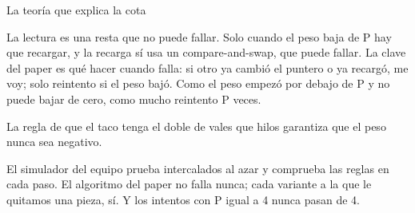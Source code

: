 \begin{frame}{La teoría que explica la cota}
{  La lectura es una resta que no puede fallar. Solo cuando el peso baja de P hay que recargar, y la recarga sí usa un compare-and-swap, que puede fallar. La clave del paper es qué hacer cuando falla: si otro ya cambió el puntero o ya recargó, me voy; solo reintento si el peso bajó. Como el peso empezó por debajo de P y no puede bajar de cero, como mucho reintento P veces.

  La regla de que el taco tenga el doble de vales que hilos garantiza que el peso nunca sea negativo.

  El simulador del equipo prueba intercalados al azar y comprueba las reglas en cada paso. El algoritmo del paper no falla nunca; cada variante a la que le quitamos una pieza, sí. Y los intentos con P igual a 4 nunca pasan de 4.}
\end{frame}

